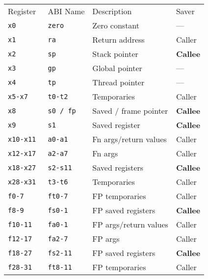 \begin{footnotesize}
    \renewcommand{\arraystretch}{1.2}
    \begin{tabularx}{\linewidth}{@{}llll@{}}
        Register     & ABI Name     & Description           & Saver           \\
        \cmidrule{1-4}
        \tt{x0}      & \tt{zero}    & Zero constant         & ---             \\
        \tt{x1}      & \tt{ra}      & Return address        & Caller          \\
        \tt{x2}      & \tt{sp}      & Stack pointer         & \textbf{Callee} \\
        \tt{x3}      & \tt{gp}      & Global pointer        & ---             \\
        \tt{x4}      & \tt{tp}      & Thread pointer        & ---             \\
        \tt{x5-x7}   & \tt{t0-t2}   & Temporaries           & Caller          \\
        \tt{x8}      & \tt{s0 / fp} & Saved / frame pointer & \textbf{Callee} \\
        \tt{x9}      & \tt{s1}      & Saved register        & \textbf{Callee} \\
        \tt{x10-x11} & \tt{a0-a1}   & Fn args/return values & Caller          \\
        \tt{x12-x17} & \tt{a2-a7}   & Fn args               & Caller          \\
        \tt{x18-x27} & \tt{s2-s11}  & Saved registers       & \textbf{Callee} \\
        \tt{x28-x31} & \tt{t3-t6}   & Temporaries           & Caller          \\
        \cmidrule{1-4}
        \tt{f0-7}    & \tt{ft0-7}   & FP temporaries        & Caller          \\
        \tt{f8-9}    & \tt{fs0-1}   & FP saved registers    & \textbf{Callee} \\
        \tt{f10-11}  & \tt{fa0-1}   & FP args/return values & Caller          \\
        \tt{f12-17}  & \tt{fa2-7}   & FP args               & Caller          \\
        \tt{f18-27}  & \tt{fs2-11}  & FP saved registers    & \textbf{Callee} \\
        \tt{f28-31}  & \tt{ft8-11}  & FP temporaries        & Caller          \\
    \end{tabularx}
    \renewcommand{\arraystretch}{1}
\end{footnotesize}